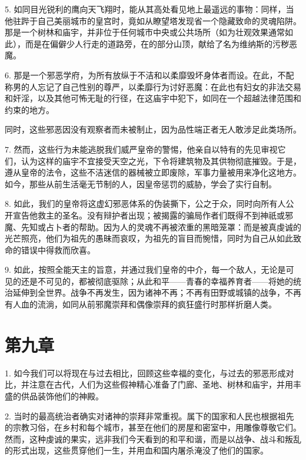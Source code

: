 5. 如同目光锐利的鹰向天飞翔时，能从其高处看见地上最遥远的事物：同样，当他驻跸于自己美丽城市的皇宫时，竟如从瞭望塔发现省一个隐藏致命的灵魂陷阱。那是一个树林和庙宇，并非位于任何城市中央或公共场所（如为壮观效果通常如此），而是在偏僻少人行走的道路旁，在的部分山顶，献给了名为维纳斯的污秽恶魔。\par

6. 那是一个邪恶学府，为所有放纵于不洁和以柔靡毁坏身体者而设。在此，不配称男的人忘记了自己性别的尊严，以柔靡行为讨好恶魔：在此也有妇女的非法交易和奸淫，以及其他可怖无耻的行径，在这庙宇中犯下，如同在一个超越法律范围和约束的地方。\par

同时，这些邪恶因没有观察者而未被制止，因为品性端正者无人敢涉足此类场所。\par

7. 然而，这些行为未能逃脱我们威严皇帝的警惕，他亲自以特有的先见审视它们，认为这样的庙宇不宜接受天空之光，下令将建筑物及其供物彻底摧毁。于是，遵从皇帝的法令，这些不洁迷信的器械被立即废除，军事力量被用来净化这地方。如今，那些从前生活毫无节制的人，因皇帝惩罚的威胁，学会了实行自制。\par

8. 如此，我们的皇帝将这虚幻邪恶体系的伪装撕下，公之于众，同时向所有人公开宣告他救主的圣名。没有辩护者出现；被揭露的骗局作者们既得不到神祇或邪魔、先知或占卜者的帮助。因为人的灵魂不再被浓重的黑暗笼罩：而是被真虔诚的光芒照亮，他们为祖先的愚昧而哀叹，为祖先的盲目而惋惜，同时为自己从如此致命的错误中得救而欣喜。\par

9. 如此，按照全能天主的旨意，并通过我们皇帝的中介，每一个敌人，无论是可见的还是不可见的，都被彻底驱除；从此和平——青春的幸福养育者——将她的统治延伸到全世界。战争不再发生，因为诸神不再；不再有田野或城镇的战争，不再有人血的流淌，如同从前邪魔崇拜和偶像崇拜的疯狂盛行时那样折磨人类。\par


\section{第九章}

1. 如今我们可以将现在与过去相比，回顾这些幸福的变化，与过去的邪恶形成对比，并注意在古代，人们为这些假神精心准备了门廊、圣地、树林和庙宇，并用丰盛的供品装饰他们的神殿。\par

2. 当时的最高统治者确实对诸神的崇拜非常重视。属下的国家和人民也根据祖先的宗教习俗，在乡村和每个城市，甚至在他们的房屋和密室中，用雕像尊敬它们。然而，这种虔诚的果实，远非我们今天看到的和平和谐，而是以战争、战斗和叛乱的形式出现，这些贯穿他们一生，并用血和国内屠杀淹没了他们的国家。\par

